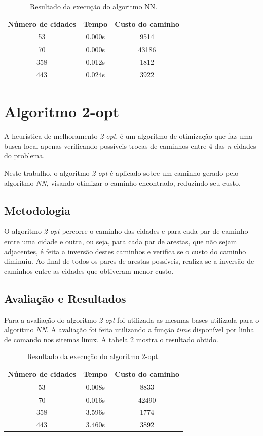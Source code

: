 \documentclass[a4paper,12pt]{article}
\begin{document}
\begin{table}[H]
\centering
\caption{Resultado da execução do algoritmo NN.} \label{TabelaNN}
\begin{tabular}{ccc}
\hline
Número de cidades & Tempo & Custo do caminho \\
\hline
53       & 0.000s    & 9514      \\
70       & 0.000s        & 43186      \\
358       & 0.012s     & 1812     \\
443       & 0.024s    & 3922     \\
\hline
\end{tabular}
\end{table}


\section{Algoritmo 2-opt}
A heurística de melhoramento \emph{2-opt}, é um algoritmo de otimização que faz uma busca local apenas 
verificando possíveis trocas de caminhos entre 4 das \emph{n} cidades do problema.

Neste trabalho, o algoritmo \emph{2-opt} é aplicado sobre um caminho gerado pelo algoritmo \emph{NN}, visando otimizar 
o caminho encontrado, reduzindo seu custo.


\subsection{Metodologia}
O algoritmo \emph{2-opt} percorre o caminho das cidades e para cada par de caminho entre uma cidade e outra, ou seja, para cada par de arestas, 
que não sejam adjacentes, é feita a inversão destes caminhos e verifica se o custo do caminho diminuiu. Ao final de todos os pares de arestas 
possíveis, realiza-se a inversão de caminhos entre as cidades que obtiveram menor custo.


\subsection{Avaliação e Resultados}
Para a avaliação do algoritmo \emph{2-opt} foi utilizada as mesmas bases utilizada para o algoritmo \emph{NN}.
A avaliação foi feita utilizando a função \emph{time} disponível por linha de comando nos sitemas linux.
A tabela \ref{TabelaOPT} mostra o resultado obtido.

\begin{table}[H]
\centering
\caption{Resultado da execução do algoritmo 2-opt.} \label{TabelaOPT}
\begin{tabular}{ccc}
\hline
Número de cidades & Tempo & Custo do caminho \\
\hline
53       & 0.008s    & 8833      \\
70       & 0.016s        & 42490      \\
358       & 3.596s     & 1774     \\
443       & 3.460s    & 3892     \\
\hline
\end{tabular}
\end{table}
\end{document}
